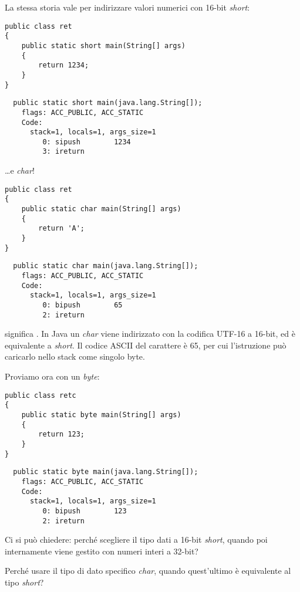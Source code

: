 La stessa storia vale per indirizzare valori numerici con 16-bit \emph{short}:

\begin{lstlisting}[style=customjava]
public class ret
{
	public static short main(String[] args)
	{
		return 1234;
	}
}
\end{lstlisting}

\begin{lstlisting}
  public static short main(java.lang.String[]);
    flags: ACC_PUBLIC, ACC_STATIC
    Code:
      stack=1, locals=1, args_size=1
         0: sipush        1234
         3: ireturn
\end{lstlisting}

\dots e \emph{char}!

\begin{lstlisting}[style=customjava]
public class ret
{
	public static char main(String[] args)
	{
		return 'A';
	}
}
\end{lstlisting}

\begin{lstlisting}
  public static char main(java.lang.String[]);
    flags: ACC_PUBLIC, ACC_STATIC
    Code:
      stack=1, locals=1, args_size=1
         0: bipush        65
         2: ireturn
\end{lstlisting}

 significa .
In Java un \emph{char} viene indirizzato con la codifica UTF-16 a 16-bit,
ed è equivalente a \emph{short}. Il codice ASCII del carattere  è 65, per cui 
l'istruzione può caricarlo nello stack come singolo byte.

Proviamo ora con un \emph{byte}:

\begin{lstlisting}[style=customjava]
public class retc
{
	public static byte main(String[] args)
	{
		return 123;
	}
}
\end{lstlisting}

\begin{lstlisting}
  public static byte main(java.lang.String[]);
    flags: ACC_PUBLIC, ACC_STATIC
    Code:
      stack=1, locals=1, args_size=1
         0: bipush        123
         2: ireturn
\end{lstlisting}

Ci si può chiedere: perché scegliere il tipo dati a 16-bit \emph{short}, quando poi internamente
viene gestito con numeri interi a 32-bit?

Perché usare il tipo di dato specifico \emph{char}, quando quest'ultimo è equivalente al tipo \emph{short}?

